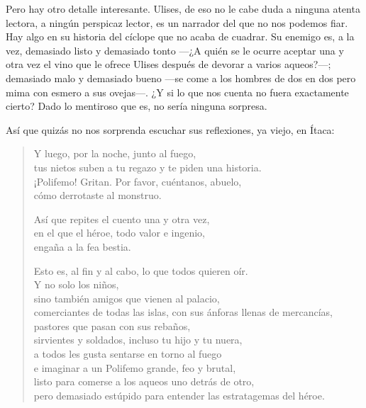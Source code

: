\documentclass[11pt,a4paper]{article}
\begin{document}
Pero hay otro detalle interesante. Ulises, de eso no le cabe duda a ninguna atenta lectora, a ningún perspicaz lector, es un narrador del que no nos podemos fiar. Hay algo en su historia del cíclope que no acaba de cuadrar. Su enemigo es, a la vez, demasiado listo y demasiado tonto ---¿A quién se le ocurre aceptar una y otra vez el vino que le ofrece Ulises después de devorar a varios aqueos?---; demasiado malo y demasiado bueno ---se come a los hombres de dos en dos pero mima con esmero a sus ovejas---. ¿Y si lo que nos cuenta no fuera exactamente cierto? Dado lo mentiroso que es, no sería ninguna sorpresa.

Así que quizás no nos sorprenda escuchar sus reflexiones, ya viejo, en Ítaca:

\begin{verse}
Y luego, por la noche, junto al fuego,\\
tus nietos suben a tu regazo y te piden una historia.\\
¡Polifemo! Gritan. Por favor, cuéntanos, abuelo,\\
cómo derrotaste al monstruo.

Así que repites el cuento una y otra vez,\\
en el que el héroe, todo valor e ingenio,\\
engaña a la fea bestia.

Esto es, al fin y al cabo, lo que todos quieren oír.\\
Y no solo los niños,\\
sino también amigos que vienen al palacio,\\
comerciantes de todas las islas, con sus ánforas llenas de mercancías,\\
pastores que pasan con sus rebaños,\\
sirvientes y soldados, incluso tu hijo y tu nuera,\\
a todos les gusta sentarse en torno al fuego\\
e imaginar a un Polifemo grande, feo y brutal,\\
listo para comerse a los aqueos uno detrás de otro,\\
pero demasiado estúpido para entender las estratagemas del héroe.


\end{verse}
\end{document}
